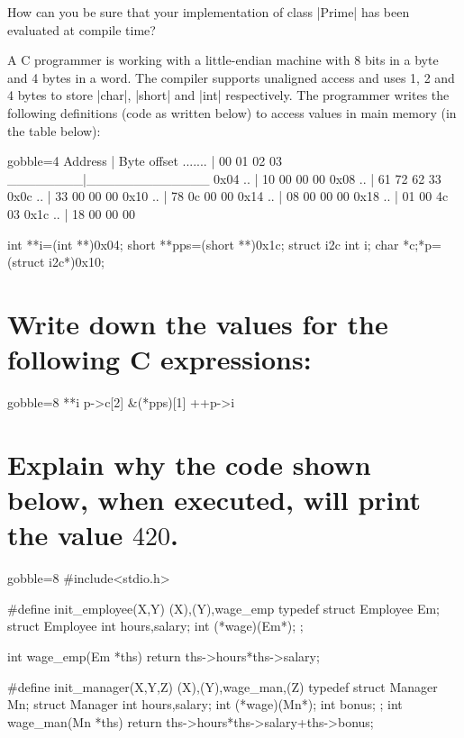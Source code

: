 \documentclass[NewMint]{supervision}
\begin{document}
\begin{questions}
    \question
    How can you be sure that your implementation of class \cppinline|Prime| has been evaluated at compile time?


    A C programmer is working with a little-endian machine with 8 bits in a byte and 4 bytes in a word. The compiler supports unaligned access and uses 1, 2 and 4 bytes to store \cppinline|char|, \cppinline|short| and \cppinline|int| respectively. The programmer writes the following definitions (code as written below) to access values in main memory (in the table below):
    \begin{cppcode*}{gobble=4}
    Address | Byte offset
    ....... | 00 01 02 03
    ________|_____________
    0x04 .. | 10 00 00 00
    0x08 .. | 61 72 62 33
    0x0c .. | 33 00 00 00
    0x10 .. | 78 0c 00 00 
    0x14 .. | 08 00 00 00
    0x18 .. | 01 00 4c 03
    0x1c .. | 18 00 00 00

    int **i=(int **)0x04;
    short **pps=(short **)0x1c;
    struct i2c {int i; char *c;}*p=(struct i2c*)0x10;
    \end{cppcode*}

    \begin{parts}
        \part[8]{Write down the values for the following C expressions:}
        \begin{cppcode*}{gobble=8}
        **i 
        p->c[2] 
        &(*pps)[1] 
        ++p->i
        \end{cppcode*}
        
        \part[4]{Explain why the code shown below, when executed, will print the value $420$.}
        \begin{cppcode*}{gobble=8}
        #include<stdio.h>

        #define init_employee(X,Y) {(X),(Y),wage_emp} 
        typedef struct Employee Em; 
        struct Employee {
            int hours,salary;
            int (*wage)(Em*);
        };

        int wage_emp(Em *ths) {
            return ths->hours*ths->salary;
        }

        #define init_manager(X,Y,Z) {(X),(Y),wage_man,(Z)} 
        typedef struct Manager Mn; 
        struct Manager {
            int hours,salary;
            int (*wage)(Mn*);
            int bonus;
        }; 
        int wage_man(Mn *ths){
            return ths->hours*ths->salary+ths->bonus;
        }


\end{cppcode*}
\end{parts}
\end{questions}
\end{document}
